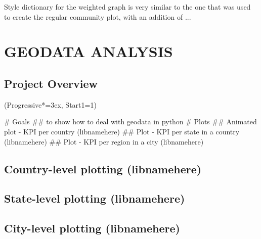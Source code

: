 \documentclass[12pt, a4paper]{article}
\let\OldEasylist\easylist
\let\OldEndEasylist\endeasylist
\renewenvironment{easylist}{%
    \OldEasylist%
    \ListProperties(Progressive*=3ex, Start1=1)%
}{%
    \OldEndEasylist%
}%
\begin{document}
%

Style dictionary for the weighted graph is very similar to the one that was used to create the regular community plot, with an addition of ...


%



\newpage
\section{GEODATA ANALYSIS}

\subsection{Project Overview}
\begin{easylist}
# Goals
## to show how to deal with geodata in python
# Plots
## Animated plot - KPI per country (libnamehere)
## Plot - KPI per state in a country (libnamehere)
## Plot - KPI per region in a city (libnamehere)
\end{easylist}

\subsection{Country-level plotting (libnamehere)}

\subsection{State-level plotting (libnamehere)}

\subsection{City-level plotting (libnamehere)}





\newpage
\nocite{*}


\end{document}
